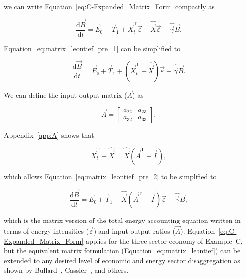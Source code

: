 \noindent{}we can write Equation~\ref{eq:C-Expanded_Matrix_Form}
compactly as

\begin{equation} \label{eq:matrix_leontief_pre_1}
	\frac{\mathrm{d}\vec{B}}{\mathrm{d}t} 
	= \vec{E}_{0}
	+ \vec{T}_{1}
	+ \vec{X}_{t}^{\mathrm{T}}\vec{\varepsilon} 
	- \hat{\vec{X}}\vec{\varepsilon}
	- \hat{\vec{\gamma}}\vec{B}.
\end{equation}

\noindent{}Equation~\ref{eq:matrix_leontief_pre_1} can be simplified to

\begin{equation} \label{eq:matrix_leontief_pre_2}
	\frac{\mathrm{d}\vec{B}}{\mathrm{d}t} 
	= \vec{E}_{0}
	+ \vec{T}_{1}
	+ (\vec{X}_{t}^{\mathrm{T}} - \hat{\vec{X}})\vec{\varepsilon} 
	- \hat{\vec{\gamma}}\vec{B}.
\end{equation}

\noindent{}We can define the input-output matrix ($\vec{A}$) as

\begin{equation} \label{eq:A_matrix_def}
	\vec{A} 
	=
	\begin{bmatrix}
		a_{22} & a_{23}	\\
		a_{32} & a_{33}	
	\end{bmatrix}.
\end{equation}

\noindent{}Appendix~\ref{app:A} shows that

\begin{equation} \label{eq:Xdifference1}
	\vec{X}_{t}^{\mathrm{T}} 
	- \hat{\vec{X}} 
	= \hat{\vec{X}} (\vec{A}^{\mathrm{T}} - \vec{I}),
\end{equation}

\noindent{}which allows Equation~\ref{eq:matrix_leontief_pre_2}
to be simplified to

\begin{equation} \label{eq:matrix_leontief}
	\frac{\mathrm{d}\vec{B}}{\mathrm{d}t} 
	= \vec{E}_{0}
	+ \vec{T}_{1}
	+ \hat{\vec{X}} (\vec{A}^{\mathrm{T}} - \vec{I})\vec{\varepsilon} 
	- \hat{\vec{\gamma}}\vec{B},
\end{equation}

\noindent{}which is the matrix version 
of the total energy accounting equation
written in terms of energy intensities ($\vec{\varepsilon}$)
and input-output ratios ($\vec{A}$).
Equation~\ref{eq:C-Expanded_Matrix_Form} applies 
for the three-sector economy of Example~C, 
but the equivalent matrix formulation (Equation~\ref{eq:matrix_leontief}) 
can be extended to any desired level 
of economic and energy sector disaggregation 
as shown by Bullard~\cite{Bullard1976a}, 
Cassler~\cite{Casler1984}, and others.

